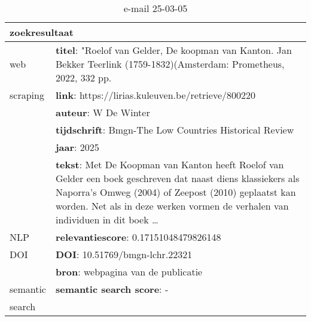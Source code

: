 \begin{table}[h!]
    \caption{e-mail 25-03-05}
    \centering
    \begin{tabularx}{\textwidth}{|p{4cm}|X|} 
        \hline
        \multicolumn{2}{|X|}{\textbf{zoekresultaat}} \\
        \hline
        web &\textbf{titel}:  "Roelof van Gelder, De koopman van Kanton. Jan Bekker Teerlink (1759-1832)(Amsterdam: Prometheus, 2022, 332 pp.\\
        scraping&\textbf{link}: https://lirias.kuleuven.be/retrieve/800220\\
        &\textbf{auteur}: W De Winter\\
        &\textbf{tijdschrift}: Bmgn-The Low Countries Historical Review\\
        &\textbf{jaar}: 2025\\
        &\textbf{tekst}: Met De Koopman van Kanton heeft Roelof van Gelder een boek geschreven dat naast diens klassiekers als Naporra’s Omweg (2004) of Zeepost (2010) geplaatst kan worden. Net als in deze werken vormen de verhalen van individuen in dit boek …\\
        \hline
        NLP&\textbf{relevantiescore}: 0.17151048479826148\\
        \hline
        DOI&\textbf{DOI}: 10.51769/bmgn-lchr.22321\\
        &\textbf{bron}: webpagina van de publicatie\\
        \hline
        semantic&\textbf{semantic search score}: -\\
        search&\\
        \hline
    \end{tabularx}
    \label{table:email20250305}
\end{table}
